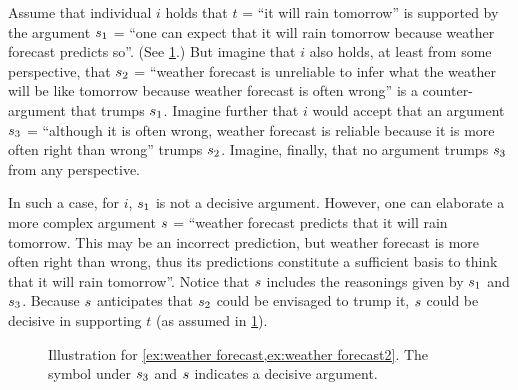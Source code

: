 \documentclass[version=3.21, pagesize, twoside=off, bibliography=totoc, DIV=calc, fontsize=12pt, a4paper]{scrartcl}
\begin{document}
\begin{example}
\label{ex:weather forecast}
Assume that individual $i$ holds that $t$ = “it will rain tomorrow” is supported by the argument $s_1$ = “one can expect that it will rain tomorrow because weather forecast predicts so”. (See \cref{fig:weather forecast}.) But imagine that $i$ also holds, at least from some perspective, that $s_2$ = “weather forecast is unreliable to infer what the weather will be like tomorrow because weather forecast is often wrong” is a counter-argument that trumps $s_1$. Imagine further that $i$ would accept that an argument $s_3$ = “although it is often wrong, weather forecast is reliable because it is more often right than wrong” trumps $s_2$. Imagine, finally, that no argument trumps $s_3$ from any perspective.

In such a case, for $i$, $s_1$ is not a decisive argument. However, one can elaborate a more complex argument $s$ = “weather forecast predicts that it will rain tomorrow. This may be an incorrect prediction, but weather forecast is more often right than wrong, thus its predictions constitute a sufficient basis to think that it will rain tomorrow”. Notice that $s$ includes the reasonings given by $s_1$ and $s_3$.
Because $s$ anticipates that $s_2$ could be envisaged to trump it, $s$ could be decisive in supporting $t$ (as assumed in \cref{fig:weather forecast}).
\end{example}
\begin{figure}
	\centering
	\caption{Illustration for \cref{ex:weather forecast,ex:weather forecast2}. The symbol under $s_3$ and $s$ indicates a decisive argument.}
	\label{fig:weather forecast}
\end{figure}
\end{document}
